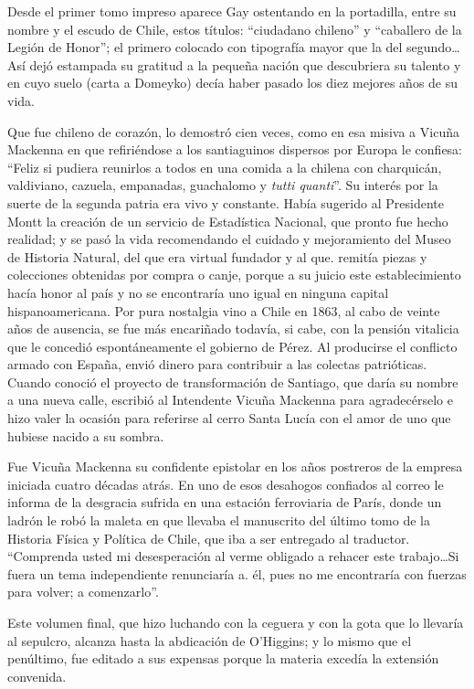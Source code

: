 \documentclass[10pt,twoside,openright]{memoir}
\begin{document}
Desde el primer tomo impreso aparece Gay ostentando en la portadilla,
entre su nombre y el escudo de Chile, estos títulos: ``ciudadano chileno''
y ``caballero de la Legión de Honor''; el primero colocado con tipografía
mayor que la del segundo\ldots Así dejó estampada su gratitud a la pequeña
nación que descubriera su talento y en cuyo suelo (carta a Domeyko)
decía haber pasado los diez mejores años de su vida.

Que fue chileno de corazón, lo demostró cien veces, como en esa misiva a
Vicuña Mackenna en que refiriéndose a los santiaguinos dispersos por
Europa le confiesa: ``Feliz si pudiera reunirlos a todos en una comida a
la chilena con charquicán, valdiviano, cazuela, empanadas, guachalomo y
\emph{tutti quanti}''. Su interés por la suerte de la segunda patria era
vivo y constante. Había sugerido al Presidente Montt la creación de un
servicio de Estadística Nacional, que pronto fue hecho realidad; y se
pasó la vida recomendando el cuidado y mejoramiento del Museo de
Historia Natural, del que era virtual fundador y al que. remitía piezas
y colecciones obtenidas por compra o canje, porque a su juicio este
establecimiento hacía honor al país y no se encontraría uno igual en
ninguna capital hispanoamericana. Por pura nostalgia vino a Chile en
1863, al cabo de veinte años de ausencia, se fue más encariñado todavía,
si cabe, con la pensión vitalicia que le concedió espontáneamente el
gobierno de Pérez. Al producirse el conflicto armado con España, envió
dinero para contribuir a las colectas patrióticas. Cuando conoció el
proyecto de transformación de Santiago, que daría su nombre a una nueva
calle, escribió al Intendente Vicuña Mackenna para agradecérselo e hizo
valer la ocasión para referirse al cerro Santa Lucía con el amor de uno
que hubiese nacido a su sombra.

Fue Vicuña Mackenna su confidente epistolar en los años postreros de la
empresa iniciada cuatro décadas atrás. En uno de esos desahogos
confiados al correo le informa de la desgracia sufrida en una estación
ferroviaria de París, donde un ladrón le robó la maleta en que llevaba
el manuscrito del último tomo de la Historia Física y Política de Chile,
que iba a ser entregado al traductor. ``Comprenda usted mi desesperación
al verme obligado a rehacer este trabajo\ldots Si fuera un tema
independiente renunciaría a. él, pues no me encontraría con fuerzas para
volver; a comenzarlo''.

Este volumen final, que hizo luchando con la ceguera y con la gota que
lo llevaría al sepulcro, alcanza hasta la abdicación de O'Higgins; y lo
mismo que el penúltimo, fue editado a sus expensas porque la materia
excedía la extensión convenida.
\end{document}
